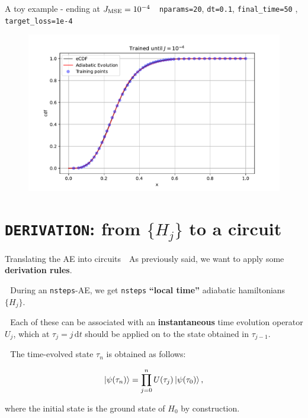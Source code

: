 \documentclass[8pt, xcolor={svgnames}, hyperref={colorlinks, linkcolor=black, citecolor=amethyst, urlcolor=amethyst}]{beamer}
\begin{document}
\begin{frame}[fragile]{A toy example - ending at $J_{\rm MSE}=10^{-4}$}
\large
\faArrowCircleRight\,\, \texttt{nparams=20}, \texttt{dt=0.1}, \texttt{final\_time=50}
, \texttt{target\_loss=1e-4}
\begin{figure}
    \includegraphics[width=1\textwidth]{figures/ev3.pdf}
\end{figure}
\end{frame}

\section{\texttt{DERIVATION}: from $\{H_j\}$ to a circuit}

\begin{frame}{Translating the AE into circuits}
\large 
 \faArrowCircleRight\,\, As previously said, we want to apply some \textbf{derivation rules}.
\pause

 \faArrowCircleRight\,\, During an \texttt{nsteps}-AE, we get \texttt{nsteps} 
 \textbf{``local time''} adiabatic hamiltonians $\{H_j\}$. 
\pause

\faArrowCircleRight\,\, Each of these can be associated with an \textbf{instantaneous} 
time evolution operator $U_j$, which at $\tau_j = j\,\text{d}t$ 
should be applied on to the state obtained in $\tau_{j-1}$.
\pause 

\faArrowCircleRight\,\, The time-evolved state $\tau_n$ is obtained as follows: 

\begin{equation}
  \ket{\psi(\tau_n)} = \prod_{j=0}^{n} U(\tau_j)\ket{\psi(\tau_{0})},
  \label{sequence} 
\end{equation}

where the initial state is the ground state of $H_0$ by construction.

\end{frame}
\end{document}
